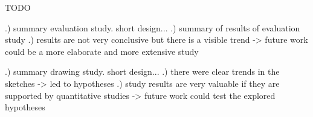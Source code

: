 TODO 

.) summary evaluation study. short design...
.) summary of results of evaluation study
.) results are not very conclusive but there is a visible trend -> future work could be a more elaborate and more extensive study

.) summary drawing study. short design...
.) there were clear trends in the sketches -> led to hypotheses
.) study results are very valuable if they are supported by quantitative studies -> future work could test the explored hypotheses
